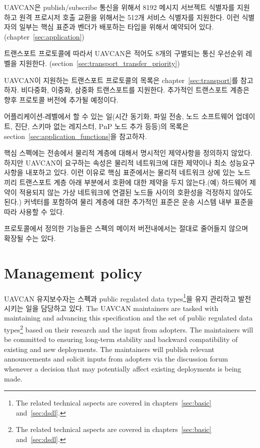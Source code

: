 UAVCAN은 publish/subscribe 통신을 위해서 8192 메시지 서브젝트 식별자를 지원하고 원격 프로시저 호출 교환을 위해서는 512개 서비스 식별자를 지원한다.
이런 식별자의 일부는 핵심 표준과 벤더가 배포하는 타입을 위해서 예약되어 있다.(chapter~\ref{sec:application})

트랜스포트 프로토콜에 따라서 UAVCAN은 적어도 8개의 구별되는 통신 우선순위 레벨을 지원한다. (section~\ref{sec:transport_transfer_priority})

UAVCAN이 지원하는 트랜스포트 프로토콜의 목록은 chapter~\ref{sec:transport}를 참고하자.
비다중화, 이중화, 삼중화 트랜스포트를 지원한다.
추가적인 트랜스포트 계층은 향후 프로토콜 버전에 추가될 예정이다.

어플리케이션-레벨에서 할 수 있는 일(시간 동기화, 파일 전송, 노드 소프트웨어 업데이트, 진단, 스키마 없는 레지스터, PnP 노드 추가 등등)의 목록은 section~\ref{sec:application_functions}을 참고하자.

핵심 스펙에는 전송에서 물리적 계층에 대해서 명시적인 제약사항을 정의하지 않았다. 하지만 UAVCAN이 요구하는 속성은 물리적 네트워크에 대한 제약이나 최소 성능요구사항을 내포하고 있다. 이런 이유로 핵심 표준에서는 물리적 네트워크 상에 있는 노드끼리 트랜스포트 계층 아래 부분에서 호환에 대한 제약을 두지 않는다.(예) 하드웨어 제약이 적용되지 않는 가상 네트워크에 연결된 노드들 사이의 호환성을 걱정하지 않아도 된다.)
커넥터를 포함하여 물리 계층에 대한 추가적인 표준은 운송 시스템 내부 표준을 따라 사용할 수 있다.

프로토콜에서 정의한 기능들은 스펙의 메이저 버전내에서는 절대로 줄어들지 않으며 확장될 수는 있다.

\section{Management policy}

UAVCAN 유지보수자는 스펙과 public regulated data types\footnote{%
The related technical aspects are covered in chapters~\ref{sec:basic} and~\ref{sec:dsdl}.
}을 유지 관리하고 발전시키는 일을 담당하고 있다.
The UAVCAN maintainers are tasked with maintaining and advancing this specification and
the set of public regulated data types\footnote{%
    The related technical aspects are covered in chapters~\ref{sec:basic} and~\ref{sec:dsdl}.
} based on their research and the input from adopters.
The maintainers will be committed to ensuring long-term stability and backward compatibility of
existing and new deployments.
The maintainers will publish relevant announcements and solicit inputs from adopters
via the discussion forum whenever a decision that may potentially affect existing deployments is being made.

